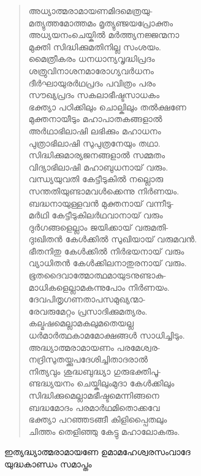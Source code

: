 \begin{verse}
അധ്യാത്മരാമായണമിദമെത്രയു-\\
മത്യുത്തമോത്തമം മൃത്യുഞ്ജയപ്രോക്തം\\
അധ്യയനംചെയ്കില്‍ മര്‍ത്ത്യനജ്ജന്മനാ\\
മുക്തി സിദ്ധിക്കുമതിനില്ല സംശയം.\\
മൈത്രീകരം ധനധാന്യവൃദ്ധിപ്രദം\\
ശത്രുവിനാശനമാരോഗ്യവര്‍ധനം\\
ദീര്‍ഘായുരര്‍ഥപ്രദം പവിത്രം പരം\\
സൗഖ്യപ്രദം സകലാഭീഷ്ടസാധകം\\
ഭക്ത്യാ പഠിക്കിലും ചൊല്കിലും തല്‍ക്ഷണേ\\
മുക്തനായീടും മഹാപാതകങ്ങളാല്‍\\
അര്‍ഥാഭിലാഷി ലഭിക്കും മഹാധനം\\
പുത്രാഭിലാഷി സുപുത്രനേയും തഥാ.\\
സിദ്ധിക്കുമാര്യജനങ്ങളാല്‍ സമ്മതം\\
വിദ്യാഭിലാഷി മഹാബുധനായ് വരും.\\
വന്ധ്യയുവതി കേട്ടീടുകില്‍ നല്ലൊരു\\
സന്തതിയുണ്ടാമവള്‍ക്കെന്നു നിര്‍ണയം.\\
ബദ്ധനായുള്ളവന്‍ മുക്തനായ് വന്നീടു-\\
മര്‍ഥി കേട്ടീടുകിലര്‍ഥവാനായ് വരും\\
ദുര്‍ഗങ്ങളെല്ലാം ജയിക്കായ് വരുമതി-\\
ദുഃഖിതന്‍ കേള്‍ക്കില്‍ സുഖിയായ് വരുമവന്‍.\\
ഭീതനിതു കേള്‍ക്കില്‍ നിര്‍ഭയനായ് വരും\\
വ്യാധിതന്‍ കേള്‍ക്കിലനാതുരനായ് വരും.\\
ഭൂതദൈവാത്മോത്ഥമായുടനുണ്ടാകു-\\
മാധികളെല്ലാമകന്നുപോം നിര്‍ണയം.\\
ദേവപിതൃഗണതാപസമുഖ്യന്മാ-\\
രേവരുമേറ്റം പ്രസാദിക്കുമത്യരം.\\
കല്മഷമെല്ലാമകലുമതെയല്ല\\
ധര്‍മാര്‍ത്ഥകാമമോക്ഷങ്ങള്‍ സാധിച്ചിടും.\\
അദ്ധ്യാത്മരാമായണം പരമേശ്വര-\\
നദ്രിസുതയ്ക്കുപദേശിച്ചിതാദരാല്‍\\
നിത്യവും ശുദ്ധബുദ്ധ്യാ ഗുരുഭക്തിപൂ-\\
ണ്ടദ്ധ്യയനം ചെയ്കിലുംമുദാ കേള്‍ക്കിലും\\
സിദ്ധിക്കുമെല്ലാമഭീഷ്ടമെന്നിങ്ങനെ\\
ബദ്ധമോദം പരമാര്‍ഥമിതൊക്കവേ\\
ഭക്ത്യാ പറഞ്ഞടങ്ങീ കിളിപ്പൈതലും\\
ചിത്തം തെളിഞ്ഞു കേട്ടു മഹാലോകരും.
\end{verse}

\begin{center}
ഇത്യദ്ധ്യാത്മരാമായണേ ഉമാമഹേശ്വരസംവാദേ\\
യുദ്ധകാണ്ഡം സമാപ്തം
\end{center}



